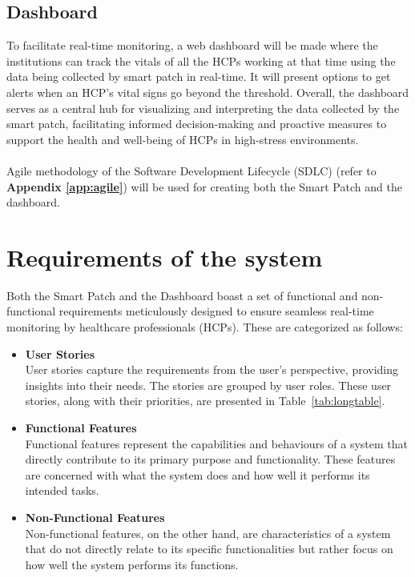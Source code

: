 \subsection{Dashboard}
 To facilitate real-time monitoring, a web dashboard will be made where the institutions can track the vitals of all the HCPs working at that time using the data being collected by smart patch in real-time. It will present options to get alerts when an HCP’s vital signs go beyond the threshold. Overall,  the dashboard serves as a central hub for visualizing and interpreting the data collected by the smart patch, facilitating informed decision-making and proactive measures to support the health and well-being of HCPs in high-stress environments. \\ \\

\noindent Agile methodology of the Software Development Lifecycle (SDLC) (refer to \textbf{Appendix \ref{app:agile}}) will be used for creating both the Smart Patch and the dashboard.
  
\section{Requirements of the system}
 Both the Smart Patch and the Dashboard boast a set of functional and non-functional requirements meticulously designed to ensure seamless real-time monitoring by healthcare professionals (HCPs). These are categorized as follows: 

  \begin{itemize}
        \item \textbf{User Stories} \\ 
        User stories capture the requirements from the user's perspective, providing insights into their needs. The stories are grouped by user roles. These user stories, along with their priorities, are presented in Table~\ref{tab:longtable}.
        
        \item \textbf{Functional Features} \\
    Functional features represent the capabilities and behaviours of a system that directly contribute to its primary purpose and functionality. These features are concerned with what the system does and how well it performs its intended tasks. 

        \item \textbf{Non-Functional Features} \\
    Non-functional features, on the other hand, are characteristics of a system that do not directly relate to its specific functionalities but rather focus on how well the system performs its functions. 
    
    \end{itemize}
 
